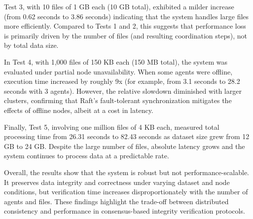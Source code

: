 Test 3, with 10 files of 1 GB each (10 GB total), exhibited a milder increase
(from 0.62 seconds to 3.86 seconds) indicating that the system handles large files more efficiently. Compared to Tests 1 and 2, this suggests that performance loss is primarily driven by the number of files (and resulting coordination steps), not by total data size.

In Test 4, with 1,000 files of 150 KB each (150 MB total), the system was evaluated under partial node unavailability. When some agents were offline, execution time increased by roughly 9x (for example, from 3.1 seconds to 28.2 seconds with 3 agents). However, the relative slowdown diminished with larger clusters, confirming that Raft's fault-tolerant synchronization mitigates the effects of offline nodes, albeit at a cost in latency.

Finally, Test 5, involving one million files of 4 KB each, measured total
processing time from 26.31 seconds to 82.43 seconds as dataset size grew from 12 GB to 24
GB. Despite the large number of files, absolute latency grows and the system continues to process data at a predictable rate.

Overall, the results show that the system is robust but not
performance-scalable. It preserves data integrity and correctness under varying
dataset and node conditions, but verification time increases disproportionately
with the number of agents and files. These findings highlight the trade-off
between distributed consistency and performance in consensus-based integrity
verification protocols.
